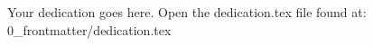 
\begin{dedication} %

\vspace{31mm}

Your dedication  goes here. 
Open the dedication.tex file found at: 0\_frontmatter/dedication.tex

\end{dedication}

